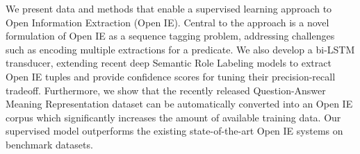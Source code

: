 We present data and methods that enable a supervised learning approach to Open Information Extraction (Open IE). Central to the approach is a novel formulation of Open IE as a sequence tagging problem, addressing challenges such as encoding multiple extractions for a predicate. We also develop a bi-LSTM transducer, extending recent deep Semantic Role Labeling models to extract Open IE tuples and provide confidence scores for tuning their precision-recall tradeoff. Furthermore, we show that the recently released Question-Answer Meaning Representation dataset can be automatically converted into an Open IE corpus which significantly increases the amount of available training data. Our supervised model outperforms the existing state-of-the-art Open IE systems on benchmark datasets.
